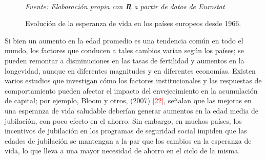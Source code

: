 \vspace{-1.2cm}
\begin{figure}[H]
\hspace*{-1.8cm}
\vspace{-0.5cm}
\caption{Evolución de la esperanza de vida en los países europeos desde 1966.}\\
\hspace{4cm}\textit{\small{Fuente: Elaboración propia con \textbf{R} a partir de datos de Eurostat}}
\label{fig:globfig}
\end{figure}

\newpage
Si bien un aumento en la edad promedio es una tendencia común en todo el mundo, los factores que conducen a tales cambios varían según los países; se pueden remontar a disminuciones en las tasas de fertilidad y aumentos en la longevidad, aunque en diferentes magnitudes y en diferentes economías. Existen varios estudios que investigan cómo los factores institucionales y las respuestas de comportamiento pueden afectar el impacto del envejecimiento en la acumulación de capital; por ejemplo, Bloom y otros, (2007) \textcolor{red}{[22]}, señalan que las mejoras en una esperanza de vida saludable deberían generar aumentos en la edad media de jubilación, con poco efecto en el ahorro. Sin embargo, en muchos países, los incentivos de jubilación en los programas de seguridad social impiden que las edades de jubilación se mantengan a la par que los cambios en la esperanza de vida, lo que lleva a una mayor necesidad de ahorro en el ciclo de la misma.\\

